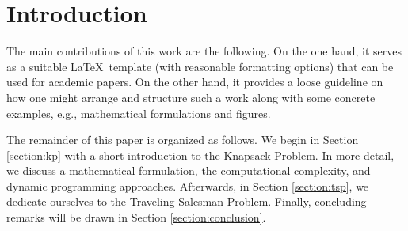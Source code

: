 \section{Introduction}
\label{sec:Introduction}
\blindtext

The main contributions of this work are the following.
On the one hand, it serves as a suitable \LaTeX\ template (with reasonable formatting options) that can be used for academic papers.
On the other hand, it provides a loose guideline on how one might arrange and structure such a work along with some concrete examples, e.g., mathematical formulations and figures.

The remainder of this paper is organized as follows.
We begin in Section \ref{section:kp} with a short introduction to the Knapsack Problem.
In more detail, we discuss a mathematical formulation, the computational complexity, and dynamic programming approaches.
Afterwards, in Section \ref{section:tsp}, we dedicate ourselves to the Traveling Salesman Problem.
Finally, concluding remarks will be drawn in Section \ref{section:conclusion}.
